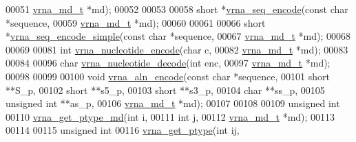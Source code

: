 \begin{DoxyCode}
00051                   \mbox{\hyperlink{group__model__details_structvrna__md__s}{vrna\_md\_t}}   *md);
00052 
00053 
00058 \textcolor{keywordtype}{short} *\mbox{\hyperlink{group__utils_ga636e7d6f888fd639587296a5eddea660}{vrna\_seq\_encode}}(\textcolor{keyword}{const} \textcolor{keywordtype}{char} *sequence,
00059                        \mbox{\hyperlink{group__model__details_structvrna__md__s}{vrna\_md\_t}}  *md);
00060 
00061 
00066 \textcolor{keywordtype}{short} *\mbox{\hyperlink{group__utils_ga3cd79d21d53248ad2634c1c0d43e97d7}{vrna\_seq\_encode\_simple}}(\textcolor{keyword}{const} \textcolor{keywordtype}{char}  *sequence,
00067                               \mbox{\hyperlink{group__model__details_structvrna__md__s}{vrna\_md\_t}}   *md);
00068 
00069 
00081 \textcolor{keywordtype}{int} \mbox{\hyperlink{group__utils_gac12bf00123f88621c9be847b0879c1fb}{vrna\_nucleotide\_encode}}(\textcolor{keywordtype}{char}       c,
00082                            \mbox{\hyperlink{group__model__details_structvrna__md__s}{vrna\_md\_t}}  *md);
00083 
00084 
00096 \textcolor{keywordtype}{char} \mbox{\hyperlink{group__utils_ga48ef585e697be9c8a08ed68c655e29b6}{vrna\_nucleotide\_decode}}(\textcolor{keywordtype}{int}       enc,
00097                             \mbox{\hyperlink{group__model__details_structvrna__md__s}{vrna\_md\_t}} *md);
00098 
00099 
00100 \textcolor{keywordtype}{void} \mbox{\hyperlink{group__utils_ga56dfbd38023d289a3b5daf7fe06ab4d6}{vrna\_aln\_encode}}(\textcolor{keyword}{const} \textcolor{keywordtype}{char}   *sequence,
00101                      \textcolor{keywordtype}{short}        **S\_p,
00102                      \textcolor{keywordtype}{short}        **s5\_p,
00103                      \textcolor{keywordtype}{short}        **s3\_p,
00104                      \textcolor{keywordtype}{char}         **ss\_p,
00105                      \textcolor{keywordtype}{unsigned} \textcolor{keywordtype}{int} **as\_p,
00106                      \mbox{\hyperlink{group__model__details_structvrna__md__s}{vrna\_md\_t}}    *md);
00107 
00108 
00109 \textcolor{keywordtype}{unsigned} \textcolor{keywordtype}{int}
00110 \mbox{\hyperlink{group__utils_ga629aeca7a1a5d148e2c7e0e5d12299cc}{vrna\_get\_ptype\_md}}(\textcolor{keywordtype}{int}       i,
00111                   \textcolor{keywordtype}{int}       j,
00112                   \mbox{\hyperlink{group__model__details_structvrna__md__s}{vrna\_md\_t}} *md);
00113 
00114 
00115 \textcolor{keywordtype}{unsigned} \textcolor{keywordtype}{int}
00116 \mbox{\hyperlink{group__utils_ga1cef98562ce6016ed83e38bc15d7b4bb}{vrna\_get\_ptype}}(\textcolor{keywordtype}{int}  ij,

\end{DoxyCode}
